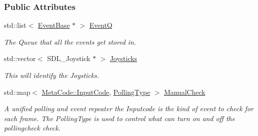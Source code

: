 \subsubsection*{Public Attributes}
\begin{DoxyCompactItemize}
\item 
\hypertarget{structMezzanine_1_1internal_1_1EventManagerInternalData_a06c1ceeb1eab29373035ac1d600c254b}{
std::list$<$ \hyperlink{classMezzanine_1_1EventBase}{EventBase} $\ast$ $>$ \hyperlink{structMezzanine_1_1internal_1_1EventManagerInternalData_a06c1ceeb1eab29373035ac1d600c254b}{EventQ}}
\label{structMezzanine_1_1internal_1_1EventManagerInternalData_a06c1ceeb1eab29373035ac1d600c254b}

\begin{DoxyCompactList}\small\item\em The Queue that all the events get stored in. \item\end{DoxyCompactList}\item 
\hypertarget{structMezzanine_1_1internal_1_1EventManagerInternalData_a5feff707f62e9fea15c2a6d9e9e75997}{
std::vector$<$ SDL\_\-Joystick $\ast$ $>$ \hyperlink{structMezzanine_1_1internal_1_1EventManagerInternalData_a5feff707f62e9fea15c2a6d9e9e75997}{Joysticks}}
\label{structMezzanine_1_1internal_1_1EventManagerInternalData_a5feff707f62e9fea15c2a6d9e9e75997}

\begin{DoxyCompactList}\small\item\em This will identify the Joysticks. \item\end{DoxyCompactList}\item 
\hypertarget{structMezzanine_1_1internal_1_1EventManagerInternalData_abb08d07076ca96a92742bc5d1da61856}{
std::map$<$ \hyperlink{classMezzanine_1_1MetaCode_a3b5633f0145bf3287cf53a3f05b5563c}{MetaCode::InputCode}, \hyperlink{structMezzanine_1_1internal_1_1EventManagerInternalData_a4179a167c7f67babd5aa4902dc279027}{PollingType} $>$ \hyperlink{structMezzanine_1_1internal_1_1EventManagerInternalData_abb08d07076ca96a92742bc5d1da61856}{ManualCheck}}
\label{structMezzanine_1_1internal_1_1EventManagerInternalData_abb08d07076ca96a92742bc5d1da61856}

\begin{DoxyCompactList}\small\item\em A unified polling and event repeater the Inputcode is the kind of event to check for each frame. The PollingType is used to control what can turn on and off the pollingcheck check. \item\end{DoxyCompactList}\end{DoxyCompactItemize}



